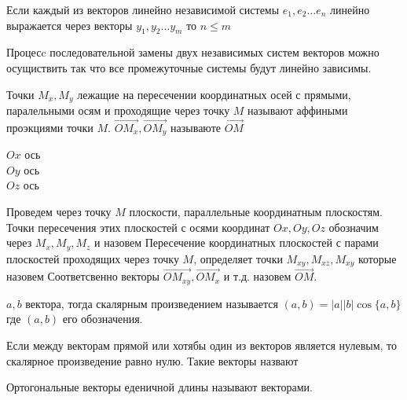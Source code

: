 \begin{theorem}
  Если каждый из векторов линейно независимой системы $e_1, e_2 \ldots e_n$
линейно выражается через векторы $y_1, y_2 \ldots y_m$ то $n \le m$
\end{theorem}

\begin{theorem}
  Процесc последовательной замены двух независимых систем векторов можно
осущиствить так что все промежуточные системы будут линейно зависимы.
\end{theorem}

\begin{defin}
  Точки $M_x, M_y$ лежащие на пересечении координатных осей с прямыми,
  паралельными осям и проходящие через точку $M$ называют аффиными проэкциями
  точки $M$. $\vec{OM_x}, \vec{OM_y}$ называюте 
  $\vec{OM}$
\end{defin}

$Ox$ ось \\
$Oy$ ось \\
$Oz$ ось 

\begin{defin}
  Проведем через точку $M$ плоскости, параллельные координатным плоскостям.
  Точки пересечения этих плоскостей с осями координат $Ox, Oy, Oz$ обозначим
  через $M_x, M_y, M_z$ и назовем
   Пересечение координатных
  плоскостей с парами плоскостей проходящих через точку $M$, определяет точки
  $M_{xy}, M_{xz}, M_{xy}$ которые назовем
   Соответсвенно
  векторы $\vec{OM_{xy}}, \vec{OM_x}$ и т.д. назовем
   $\vec{OM}$.
\end{defin}

\begin{defin}
  $a,b$ вектора, тогда скалярным произведением называется
  $(a,b) = |a||b|\cos\{a,b\}$ где $(a,b)$ его обозначения.
\end{defin}

\begin{defin}
  Если между векторам прямой или хотябы один из векторов является нулевым, то
  скалярное произведение равно нулю. Такие векторы назвают 
\end{defin}

\begin{defin}
  Ортогональные векторы еденичной длины называют 
  векторами.
\end{defin}

